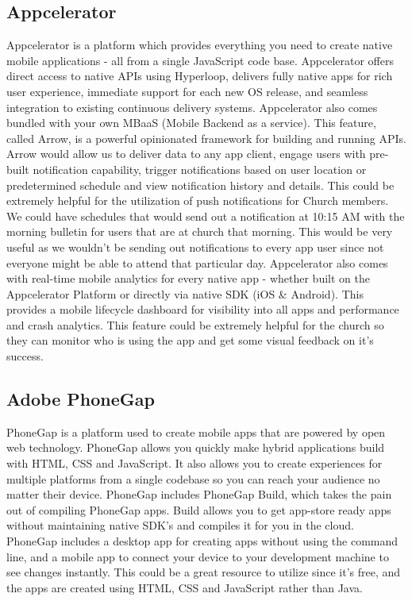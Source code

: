 \documentclass[letterpaper,10pt,draftclsnofoot,onecolumn,titlepage]{IEEEtran}
\begin{document}
		\subsection{Appcelerator}
			Appcelerator is a platform which provides everything you need to create native mobile applications - all from a single JavaScript code base. \cite{Appcelerator}
			Appcelerator offers direct access to native APIs using Hyperloop, delivers fully native apps for rich user experience, immediate support for each new OS release, and seamless integration to existing continuous delivery systems.
			Appcelerator also comes bundled with your own MBaaS (Mobile Backend as a service).
			This feature, called Arrow, is a powerful opinionated framework for building and running APIs.
			Arrow would allow us to deliver data to any app client, engage users with pre-built notification capability, trigger notifications based on user location or predetermined schedule and view notification history and details.
			This could be extremely helpful for the utilization of push notifications for Church members.
			We could have schedules that would send out a notification at 10:15 AM with the morning bulletin for users that are at church that morning.
			This would be very useful as we wouldn't be sending out notifications to every app user since not everyone might be able to attend that particular day.
			Appcelerator also comes with real-time mobile analytics for every native app - whether built on the Appcelerator Platform or directly via native SDK (iOS \& Android).
			This provides a mobile lifecycle dashboard for visibility into all apps and performance and crash analytics.
			This feature could be extremely helpful for the church so they can monitor who is using the app and get some visual feedback on it's success.

		\subsection{Adobe PhoneGap}
			PhoneGap is a platform used to create mobile apps that are powered by open web technology. \cite{PhoneGap}
			PhoneGap allows you quickly make hybrid applications build with HTML, CSS and JavaScript.
			It also allows you to create experiences for multiple platforms from a single codebase so you can reach your audience no matter their device.
			PhoneGap includes PhoneGap Build, which takes the pain out of compiling PhoneGap apps.
			Build allows you to get app-store ready apps without maintaining native SDK's and compiles it for you in the cloud.
			PhoneGap includes a desktop app for creating apps without using the command line, and a mobile app to connect your device to your development machine to see changes instantly.
			This could be a great resource to utilize since it's free, and the apps are created using HTML, CSS and JavaScript rather than Java.
\end{document}
